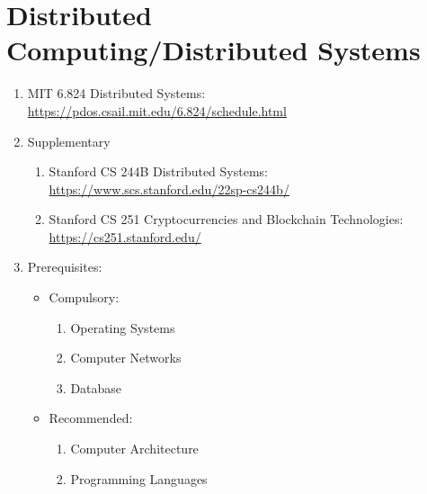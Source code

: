 \documentclass{article}
\begin{document}
\section{Distributed Computing/Distributed Systems}
\begin{enumerate}
    \item MIT 6.824 Distributed Systems:
    \href{https://pdos.csail.mit.edu/6.824/schedule.html}{https://pdos.csail.mit.edu/6.824/schedule.html}
    \item Supplementary
    \begin{enumerate}
        \item Stanford CS 244B Distributed Systems:
        \href{https://www.scs.stanford.edu/22sp-cs244b/}{https://www.scs.stanford.edu/22sp-cs244b/}
        \item Stanford CS 251 Cryptocurrencies and Blockchain Technologies:\\
        \href{https://cs251.stanford.edu/}{https://cs251.stanford.edu/}
    \end{enumerate}
    
    \item Prerequisites:
    \begin{itemize}
        \item Compulsory:
        \begin{enumerate}
        \item Operating Systems
        \item Computer Networks
        \item Database        
        \end{enumerate}
        \item Recommended:
        \begin{enumerate}
        \item Computer Architecture
        \item Programming Languages
        \end{enumerate} 
    \end{itemize}
\end{enumerate}
\end{document}
